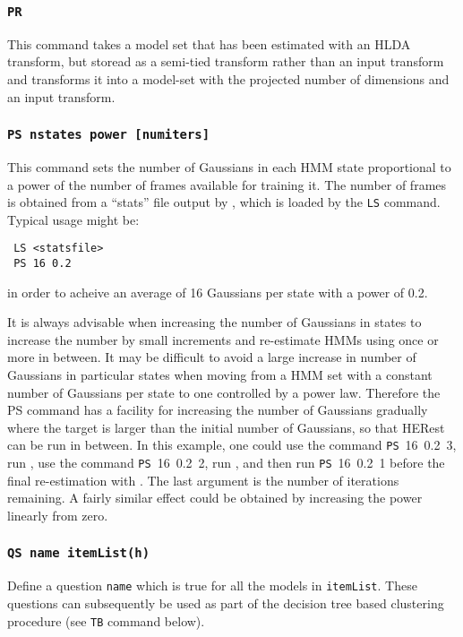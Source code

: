 \subsubsection*{\tt PR }

This command takes a model set that has been estimated with an HLDA transform,
but storead as a semi-tied transform rather than an input transform and 
transforms it into a model-set with the projected number of dimensions and
an input transform.

\subsubsection*{\tt PS nstates power [numiters]   }

This command sets the number of Gaussians in each HMM state
proportional to a power of the number of frames available for training it.  The
number of frames is obtained from a ``stats'' file output by ,
which is loaded by the \texttt{LS} command.  Typical usage might be:
\begin{verbatim}
 LS <statsfile> 
 PS 16 0.2 
\end{verbatim}
in order to acheive an average of 16 Gaussians per state with a power
of 0.2.  

It is always advisable when increasing the number of Gaussians in states to
increase the number by small increments and re-estimate HMMs using
 once or more in between.  It may be difficult to avoid a
large increase in number of Gaussians in particular states when moving from
a HMM set with a constant number of Gaussians per state to one controlled
by a power law.  Therefore the PS command has a facility for increasing
the number of Gaussians gradually where the target is larger than the
initial number of Gaussians, so that HERest can be run in between.  In this
example, one could use the  command \texttt{PS}~16~0.2~3, run
, use the command \texttt{PS}~16~0.2~2, run ,
and then run \texttt{PS}~16~0.2~1 before the final re-estimation with
.  The last argument is the number of iterations remaining.
A fairly similar effect could be obtained by increasing the power linearly
from zero.


\subsubsection*{\tt QS name itemList(h)}

Define a question \texttt{name} which is true for all the models in
\texttt{itemList}.  These questions can subsequently be used as part 
of the decision tree based clustering procedure (see \texttt{TB}
command below).

